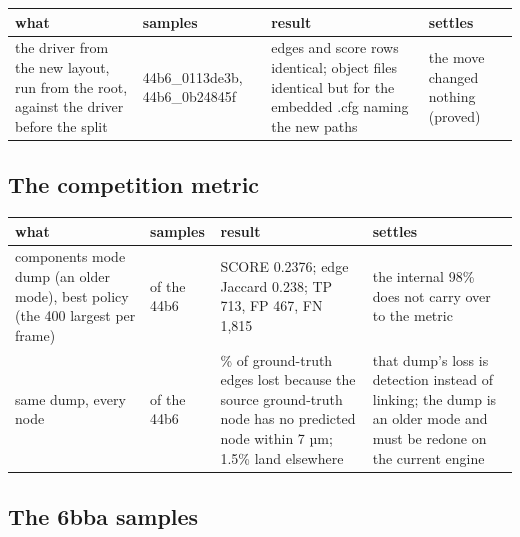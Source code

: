 {\footnotesize
\setlength{\tabcolsep}{6pt}
\begin{longtable}{>{\RaggedRight\arraybackslash}p{}>{\RaggedRight\arraybackslash}p{}>{\RaggedRight\arraybackslash}p{}>{\RaggedRight\arraybackslash}p{}}
\toprule
what & samples & result & settles \\
\midrule
\endhead
the driver from the new layout, run from the root, against the driver before the split & 44b6\_\allowbreak{}0113de3b, 44b6\_\allowbreak{}0b24845f & edges and score rows identical; object files identical but for the embedded .cfg naming the new paths & the move changed nothing (proved) \\
\bottomrule
\end{longtable}
}

\subsection{\texorpdfstring{The competition metric}{The competition metric}}

{\footnotesize
\setlength{\tabcolsep}{6pt}
\begin{longtable}{>{\RaggedRight\arraybackslash}p{}>{\RaggedRight\arraybackslash}p{}>{\RaggedRight\arraybackslash}p{}>{\RaggedRight\arraybackslash}p{}}
\toprule
what & samples & result & settles \\
\midrule
\endhead
components mode dump (an older mode), best policy (the 400 largest per frame) & 13 of the 44b6 & SCORE 0.2376; edge Jaccard 0.238; TP 713, FP 467, FN 1,815 & the internal 98\% does not carry over to the metric \\
same dump, every node & 13 of the 44b6 & 60.4\% of ground-truth edges lost because the source ground-truth node has no predicted node within 7 µm; 1.5\% land elsewhere & that dump's loss is detection instead of linking; the dump is an older mode and must be redone on the current engine \\
\bottomrule
\end{longtable}
}

\subsection{\texorpdfstring{The 6bba samples}{The 6bba samples}}

